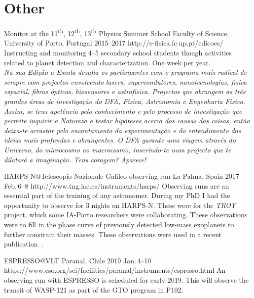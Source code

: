 \section{Other}\label{app_sec:other}

{Monitor at the 11\textsuperscript{th}, 12\textsuperscript{th}, 13\textsuperscript{th} Physics Summer School}
{Faculty of Science, University of Porto, Portugal}%
{2015--2017}%
{http://e-fisica.fc.up.pt/edicoes/}%
{}%
{Instructing and monitoring 4--5 secondary school students though activities related to planet detection and characterization.
One week per year.\\
  \emph{Na sua Edi\c{c}\~{a}o a Escola desafia os participantes com o programa mais radical de sempre com projectos envolvendo lasers, supercondutores, nanotecnologias, f\'{\i}sica espacial, fibras \'{o}pticas, biosensores e astrof\'{\i}sica.
      Projectos que abrangem as tr\^{e}s grandes áreas de investiga\c{c}\~{a}o do DFA, F\'{\i}sica, Astronomia e Engenharia F\'{\i}sica.
      Assim, se tens apet\^{e}ncia pelo conhecimento e pelo processo de investiga\c{c}\~{a}o que permite inquirir a Natureza e testar hip\'{o}teses acerca das causas das coisas, ent\~{a}o deixa-te arrastar pelo encantamento da experimenta\c{c}\~{a}o e do entendimento das ideias mais profundas e abrangentes.
      O DFA garante uma viagem através do Universo, do microcosmo ao macrocosmo, inserindo-te num projecto que te dilatar\'{a} a imagina\c{c}\~{a}o.
Tens coragem? Aparece!}}%


{HARPS-N@Telescopio Nazionale Galileo observing run}
{La Palma, Spain}%
{2017 Feb.\,6--8}%
{http://www.tng.iac.es/instruments/harps/}%
{}%
{Observing runs are an essential part of the training of any astronomer.
    During my PhD I had the opportunity to observe for 3 nights on {HARPS-N}.
    These were for the \emph{TROY} project, which some IA-Porto researchers were collaborating.
    These observations were to fill in the phase curve of previously detected low-mass exoplanets to further constrain their masses.
These observations were used in a recent publication~\citet{lillo-box_troy_2018}.
}%


{ESPRESSO@VLT}
{Paranal, Chile} %
{2019 Jan.\,4--10} %
{https://www.eso.org/sci/facilities/paranal/instruments/espresso.html} %
{}%
{An observing run with ESPRESSO is scheduled for early 2019.
This will observe the transit of WASP-121 as part of the GTO program in P102.}

